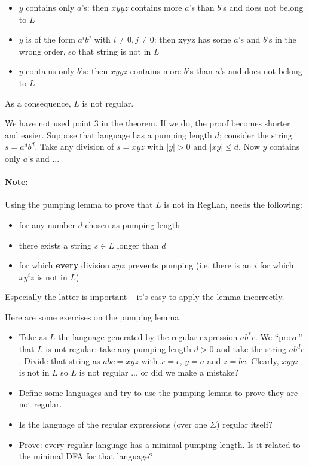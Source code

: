 \begin{itemize}
	\item $y$ contains only $a$'s: then $xyyz$ contains more $a$'s than $b$'s and
	  does not belong to $L$
	\item $y$ is of the form $a^ib^j$ with $i \neq 0, j \neq 0$: then
	xyyz has some $a$'s and $b$'s in the wrong order, so that string is not in
	$L$
	\item $y$ contains only $b$'s: then $xyyz$ contains more $b$'s than $a$'s and
	  does not belong to $L$
\end{itemize}

As a consequence, $L$ is not regular.

We have not used point 3 in the theorem. If we do, the proof becomes
shorter and easier. Suppose that language has a pumping length $d$;
consider the string $s = a^db^d$. Take any division of $s = xyz$ with
$|y| > 0$ and $|xy| \leq d$. Now $y$ contains only $a$'s and ...


\paragraph{Note:} Using the pumping lemma to prove that $L$ is not
in RegLan, needs the following:
\begin{itemize}
\item for any number $d$ chosen as pumping length
\item there exists a string $s \in L$ longer than $d$
\item for which {\bf every} division $xyz$ prevents pumping
  (i.e. there is an $i$ for which $xy^iz$ is not in $L$)
\end{itemize}

Especially the latter is important -- it's easy to apply the lemma incorrectly.

\begin{exercise}
Here are some exercises on the pumping lemma.
\begin{itemize}
\item Take as $L$ the language generated by the regular expression $ab^*c$.  We ``prove'' that $L$ is not regular: take any pumping length $d > 0$ and take the string $ab^dc$. Divide that
string as $abc = xyz$ with $x = \epsilon$, $y = a$ and $z = bc$. Clearly, $xyyz$ is not in $L$ so $L$ is not regular ... or did we make a mistake?

\item Define some languages and try to use the pumping lemma to prove they
are not regular.

\item Is the language of the regular expressions (over one $\Sigma$)
regular itself?

\item Prove: every regular language has a minimal pumping length. Is it
related to the minimal DFA for that language?
\end{itemize}
\end{exercise}

